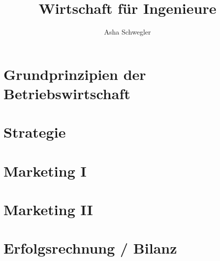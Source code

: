 \documentclass{article}
\title{Wirtschaft für Ingenieure}
\author{Asha Schwegler}
\begin{document}
\maketitle
\tableofcontents
\pagebreak

\section{Grundprinzipien der Betriebswirtschaft}


\section{Strategie}


\pagebreak
\section{Marketing I}



\section{Marketing II}




\section{Erfolgsrechnung / Bilanz}

\end{document}
